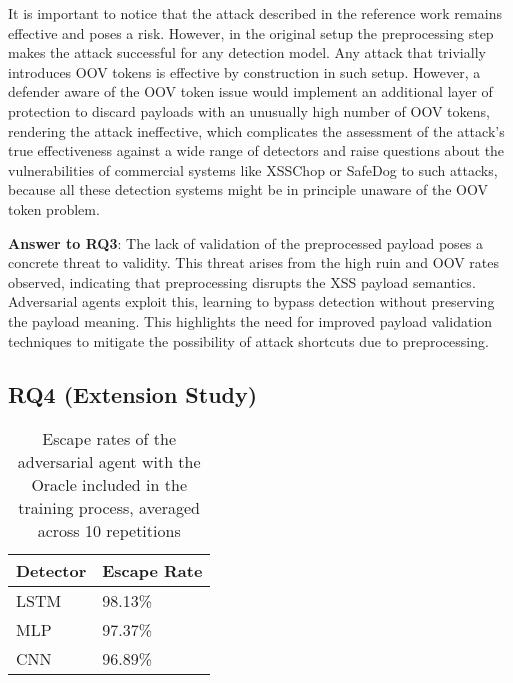 It is important to notice that the attack described in the reference work remains effective and poses a risk. 
However, in the original setup the preprocessing step makes the attack successful for any detection model. Any attack that trivially introduces OOV tokens is effective by construction in such setup. However, a defender aware of the OOV token issue would implement an additional layer of protection to discard payloads with an unusually high number of OOV tokens, rendering the attack ineffective, which complicates the assessment of the attack's true effectiveness against a wide range of detectors and raise questions about the vulnerabilities of commercial systems like XSSChop or SafeDog to such attacks, because all these detection systems might be in principle unaware of the OOV token problem.

\begin{tcolorbox}[boxrule=0pt,frame hidden,sharp corners,enhanced,borderline north={1pt}{0pt}{black},borderline south={1pt}{0pt}{black},boxsep=2pt,left=2pt,right=2pt,top=2.5pt,bottom=2pt]

\textbf{Answer to RQ3}: The lack of validation of the preprocessed payload poses a concrete threat to validity. This threat arises from the high ruin and OOV rates observed, indicating that preprocessing disrupts the XSS payload semantics. Adversarial agents exploit this, learning to bypass detection without preserving the payload meaning. This highlights the need for improved payload validation techniques to mitigate the possibility of attack shortcuts due to preprocessing.
\end{tcolorbox}




\subsection{RQ4 (Extension Study)}
\label{sec:rq4}

\begin{table}[!h]
\caption{Escape rates of the adversarial agent with the Oracle included in the training process, averaged across 10 repetitions} \label{tab:rq4}
\centering
\scalebox {1.0} {
\begin{tabular}{ll}
    \toprule
    Detector & Escape Rate \\
    \midrule
    LSTM            & 98.13\%     \\
    MLP             & 97.37\%     \\
    CNN             & 96.89\%     \\
    \bottomrule
\end{tabular}
}
\end{table}


